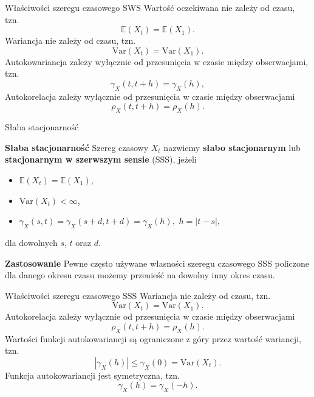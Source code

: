 \documentclass[a4paper, 11pt]{beamer}
\begin{document}
	\begin{frame}{Właściwości szeregu czasowego SWS}
		Wartość oczekiwana nie zależy od czasu, tzn. \[
			\mathbb{E}\left(X_{t}\right) = \mathbb{E}\left(X_{1}\right).
		\]
		Wariancja nie zależy od czasu, tzn. \[
			\mbox{Var}\left(X_{t}\right) = \mbox{Var}\left(X_{1}\right).
		\]
		Autokowariancja zależy wyłącznie od przesunięcia w czasie między 
			obserwacjami, tzn. \[
				\gamma_{X}\left(t, t + h\right) = \gamma_{X}\left(h\right),
			\]
		Autokorelacja zależy wyłącznie od przesunięcia w czasie między 
			obserwacjami \[
				\rho_{X}\left(t, t + h\right) = \rho_X\left(h\right).
			\]
	\end{frame}
	
	\begin{frame}{Słaba stacjonarność}
		\begin{block}{\textbf{Słaba stacjonarność}}
			Szereg czasowy $X_t$ nazwiemy \textbf{słabo stacjonarnym} lub
			\textbf{stacjonarnym w szerwszym sensie} (SSS), jeżeli
			\begin{itemize}
				\item $\mathbb{E}\left(X_{t}\right) = \mathbb{E}\left(X_{1}\right)$,
				\item $\mbox{Var}\left(X_{t}\right) < \infty$,
				\item $\gamma_X\left(s, t\right) = \gamma_X\left(s + d, t + d
					\right) = \gamma_X\left(h\right),$ $h = \left|t - s\right|,$
			\end{itemize}
			dla dowolnych $s$, $t$ oraz $d$.
		\end{block}
		\begin{alert}{\textbf{Zastosowanie}}
			Pewne często używane własności szeregu czasowego SSS policzone dla 
			danego okresu czasu możemy przenieść na dowolny inny okres czasu.
		\end{alert}
	\end{frame}
	
	\begin{frame}{Właściwości szeregu czasowego SSS}
		Wariancja nie zależy od czasu, tzn. \[
			\mbox{Var}\left(X_{t}\right) = \mbox{Var}\left(X_{1}\right).
		\]
		Autokorelacja zależy wyłącznie od przesunięcia w czasie między 
			obserwacjami \[
				\rho_{X}\left(t, t + h\right) = \rho_X\left(h\right).
			\]
		Wartości funkcji autokowariancji są ograniczone z góry przez wartość 	
		wariancji, tzn. \[
			\left|\gamma_X\left(h\right)\right| \leq
			\gamma_X\left(0\right) = \mbox{Var}\left(X_{t}\right).
		\]
		Funkcja autokowariancji jest symetryczna, tzn. \[
			\gamma_X\left(h\right) = \gamma_X\left(-h\right).
		\]
	\end{frame}
	
\end{document}
